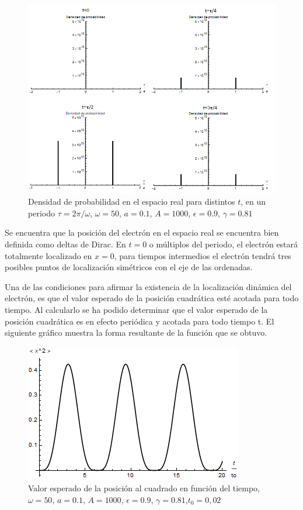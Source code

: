 \begin{figure}[H]
    \centering
    \includegraphics[width=1\columnwidth]{imagenes/dens_prop_tx.png}
    \caption{Densidad de probabilidad en el espacio real para distintos $t$, en un periodo $\tau=2\pi/\omega$, $\omega=50$, $a=0.1$, $A=1000$, $\epsilon=0.9$, $\gamma=0.81$}
    \label{fig5.13}
\end{figure}

Se encuentra que la posición del electrón en el espacio real se encuentra bien definida como deltas de Dirac. En $t=0$ o múltiplos del periodo, el electrón estará totalmente localizado en $x=0$, para tiempos intermedios el electrón tendrá tres posibles puntos de localización simétricos con el eje de las ordenadas. 

Una de las condiciones para afirmar la existencia de la localización dinámica del electrón, es que el valor esperado de la posición cuadrática esté acotada para todo tiempo. Al calcularlo se ha podido determinar que el valor esperado de la posición cuadrática es en efecto periódica y acotada para todo tiempo t. El siguiente gráfico muestra la forma resultante de la función que se obtuvo.

\begin{figure}[H]
    \centering
    \includegraphics[scale=.7]{imagenes/x2-prom.png}
    \caption{Valor esperado de la posición al cuadrado en función del tiempo,$\omega=50$, $a=0.1$, $A=1000$, $\epsilon=0.9$, $\gamma=0.81$,$t_0=0,02$}
    \label{fig:5.14}
\end{figure}

